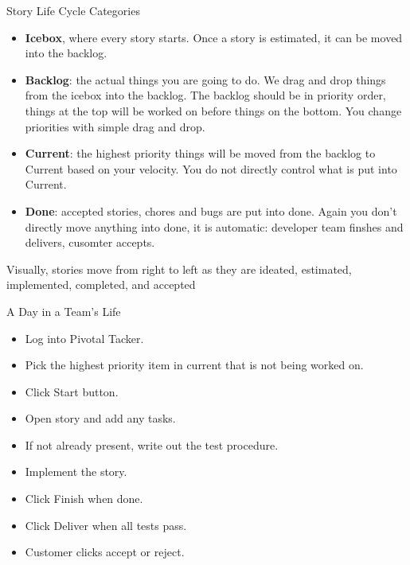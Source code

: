 \documentclass{beamer}
\begin{document}
\begin{frame}[fragile]{Story Life Cycle Categories}


\begin{itemize}
\item {\bf Icebox}, where every story starts.  Once a story is estimated, it can be moved into the backlog.
\item {\bf Backlog}: the actual things you are going to do. We drag and drop things from the icebox into the backlog.  The backlog should be in priority order, things at the top will be worked on before things on the bottom.  You change priorities with simple drag and drop.
\item {\bf Current}: the highest priority things will be moved from the backlog to Current based on your velocity.  You do not directly control what is put into Current.
\item {\bf Done}: accepted stories, chores and bugs are put into done.  Again you don't directly move anything into done, it is automatic: developer team finshes and delivers, cusomter accepts.
\end{itemize}
Visually, stories move from right to left as they are ideated, estimated, implemented, completed, and accepted

\end{frame}

\begin{frame}[fragile]{A Day in a Team's Life}


\begin{itemize}
\item Log into Pivotal Tacker.
\item Pick the highest priority item in current that is not being worked on.
\item Click Start button.
\item Open story and add any tasks.
\item If not already present, write out the test procedure.
\item Implement the story.
\item Click Finish when done.
\item Click Deliver when all tests pass.
\item Customer clicks accept or reject.
\end{itemize}

\end{frame}








\end{document}
